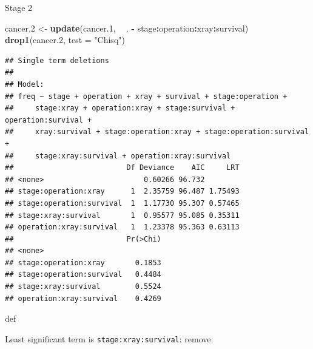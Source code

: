\documentclass[ignorenonframetext,]{beamer}
\newenvironment{Shaded}{\begin{snugshade}}{\end{snugshade}}
\newcommand{\DataTypeTok}[1]{\textcolor[rgb]{0.13,0.29,0.53}{#1}}
\newcommand{\FloatTok}[1]{\textcolor[rgb]{0.00,0.00,0.81}{#1}}
\newcommand{\KeywordTok}[1]{\textcolor[rgb]{0.13,0.29,0.53}{\textbf{#1}}}
\newcommand{\NormalTok}[1]{#1}
\newcommand{\OperatorTok}[1]{\textcolor[rgb]{0.81,0.36,0.00}{\textbf{#1}}}
\newcommand{\StringTok}[1]{\textcolor[rgb]{0.31,0.60,0.02}{#1}}
\begin{document}
\begin{frame}[fragile]{Stage 2}
\protect\hypertarget{stage-2}{}

\begin{Shaded}
\begin{Highlighting}[]
\NormalTok{cancer}\FloatTok{.2}\NormalTok{ <-}\StringTok{ }\KeywordTok{update}\NormalTok{(cancer}\FloatTok{.1}\NormalTok{, }\OperatorTok{~}\StringTok{ }\NormalTok{.}
\OperatorTok{-}\StringTok{ }\NormalTok{stage}\OperatorTok{:}\NormalTok{operation}\OperatorTok{:}\NormalTok{xray}\OperatorTok{:}\NormalTok{survival)}
\KeywordTok{drop1}\NormalTok{(cancer}\FloatTok{.2}\NormalTok{, }\DataTypeTok{test =} \StringTok{"Chisq"}\NormalTok{)}
\end{Highlighting}
\end{Shaded}

\begin{verbatim}
## Single term deletions
## 
## Model:
## freq ~ stage + operation + xray + survival + stage:operation + 
##     stage:xray + operation:xray + stage:survival + operation:survival + 
##     xray:survival + stage:operation:xray + stage:operation:survival + 
##     stage:xray:survival + operation:xray:survival
##                          Df Deviance    AIC     LRT
## <none>                       0.60266 96.732        
## stage:operation:xray      1  2.35759 96.487 1.75493
## stage:operation:survival  1  1.17730 95.307 0.57465
## stage:xray:survival       1  0.95577 95.085 0.35311
## operation:xray:survival   1  1.23378 95.363 0.63113
##                          Pr(>Chi)
## <none>                           
## stage:operation:xray       0.1853
## stage:operation:survival   0.4484
## stage:xray:survival        0.5524
## operation:xray:survival    0.4269
\end{verbatim}

def

Least significant term is \texttt{stage:xray:survival}: remove.

\end{frame}
\end{document}
